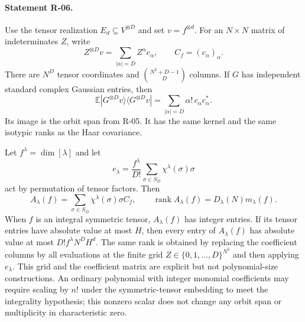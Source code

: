 \documentclass[11pt,a4paper]{article}
\theoremstyle{definition}\newtheorem{definition}{Definition}
\begin{document}
\paragraph{Statement R-06.}
Use the tensor realization $E_d\subseteq V^{\otimes D}$ and set
$v=f^{\otimes d}$. For an $N\times N$ matrix of indeterminates $Z$, write
\begin{equation}\label{R06:coefficients}
 Z^{\otimes D}v=\sum_{|\alpha|=D}Z^\alpha c_\alpha,
 \qquad C_f=(c_\alpha)_\alpha.
\end{equation}
There are $N^D$ tensor coordinates and
$\binom{N^2+D-1}{D}$ columns. If $G$ has independent standard complex
Gaussian entries, then
\begin{equation}\label{R06:gaussian}
 \mathbb E|G^{\otimes D}v\rangle\langle G^{\otimes D}v|
   =\sum_{|\alpha|=D}\alpha!\,c_\alpha c_\alpha^*.
\end{equation}
Its image is the orbit span from R-05. It has the same kernel and
the same isotypic ranks as the Haar covariance.

Let $f^\lambda=\dim[\lambda]$ and let
\[
 e_\lambda=\frac{f^\lambda}{D!}
       \sum_{\sigma\in S_D}\chi^\lambda(\sigma)\sigma
\]
act by permutation of tensor factors. Then
\begin{equation}\label{R06:integer}
 A_\lambda(f)=\sum_{\sigma\in S_D}\chi^\lambda(\sigma)\sigma C_f,
 \qquad
 \operatorname{rank}A_\lambda(f)=D_\lambda(N)m_\lambda(f).
\end{equation}
When $f$ is an integral symmetric tensor, $A_\lambda(f)$ has integer
entries. If its tensor entries have absolute value at most $H$, then
every entry of $A_\lambda(f)$ has absolute value at most
$D!f^\lambda N^D H^d$.
The same rank is obtained by replacing the coefficient columns by all
evaluations at the finite grid $Z\in\{0,1,\ldots,D\}^{N^2}$ and then
applying $e_\lambda$. This grid and the coefficient matrix are
explicit but not polynomial-size constructions.
An ordinary polynomial with integer monomial coefficients may require
scaling by $n!$ under the symmetric-tensor embedding to meet the
integrality hypothesis; this nonzero scalar does not change any orbit
span or multiplicity in characteristic zero.
\end{document}
